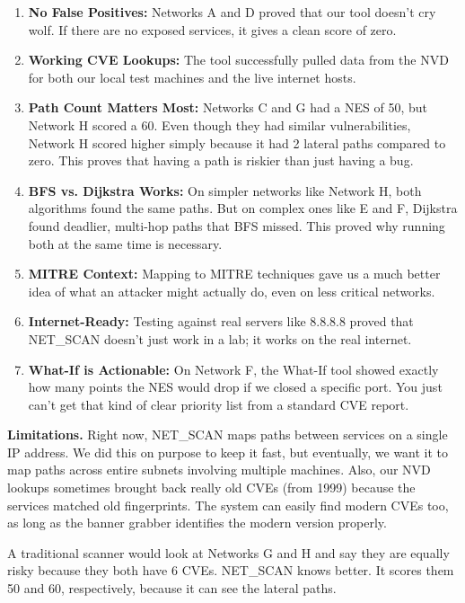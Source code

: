 \documentclass[conference]{IEEEtran}
\begin{document}
\begin{enumerate}
    \item \textbf{No False Positives:} Networks A and D proved that our tool doesn't cry wolf. If there are no exposed services, it gives a clean score of zero.
    \item \textbf{Working CVE Lookups:} The tool successfully pulled data from the NVD for both our local test machines and the live internet hosts.
    \item \textbf{Path Count Matters Most:} Networks C and G had a NES of 50, but Network H scored a 60. Even though they had similar vulnerabilities, Network H scored higher simply because it had 2 lateral paths compared to zero. This proves that having a path is riskier than just having a bug.
    \item \textbf{BFS vs. Dijkstra Works:} On simpler networks like Network H, both algorithms found the same paths. But on complex ones like E and F, Dijkstra found deadlier, multi-hop paths that BFS missed. This proved why running both at the same time is necessary.
    \item \textbf{MITRE Context:} Mapping to MITRE techniques gave us a much better idea of what an attacker might actually do, even on less critical networks.
    \item \textbf{Internet-Ready:} Testing against real servers like 8.8.8.8 proved that NET\_SCAN doesn't just work in a lab; it works on the real internet.
    \item \textbf{What-If is Actionable:} On Network F, the What-If tool showed exactly how many points the NES would drop if we closed a specific port. You just can't get that kind of clear priority list from a standard CVE report.
\end{enumerate}

\textbf{Limitations.} Right now, NET\_SCAN maps paths between services on a single IP address. We did this on purpose to keep it fast, but eventually, we want it to map paths across entire subnets involving multiple machines. Also, our NVD lookups sometimes brought back really old CVEs (from 1999) because the services matched old fingerprints. The system can easily find modern CVEs too, as long as the banner grabber identifies the modern version properly.

A traditional scanner would look at Networks G and H and say they are equally risky because they both have 6 CVEs. NET\_SCAN knows better. It scores them 50 and 60, respectively, because it can see the lateral paths.
\end{document}

